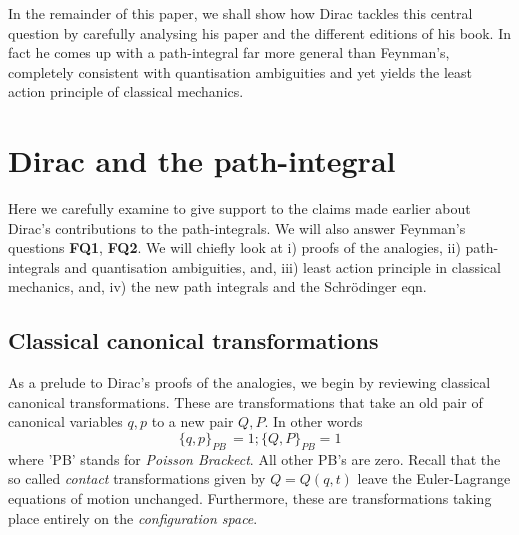 \documentclass[12pt]{article}
\newcommand{\be}{\begin{equation}}
\newcommand{\ee}{\end{equation}}
\begin{document}
In the remainder of this paper, we shall show how Dirac tackles this central question by carefully analysing his paper and the different editions of his book. In fact he comes up with a path-integral far more general than Feynman's, completely consistent with quantisation ambiguities and yet
yields the least action principle of classical mechanics. 


\section{Dirac and the path-integral}
Here we carefully examine \cite{diracpaper, diracbook2, diracbook4r} to give support to the claims made earlier about Dirac's contributions
to the path-integrals. We will also answer Feynman's questions {\bf FQ1}, {\bf FQ2}. We will chiefly look at i) proofs of the analogies, ii) 
path-integrals and quantisation ambiguities, and, iii) least action principle in classical mechanics, and, iv) the new path integrals and the
Schr\"odinger eqn. 
\subsection{Classical canonical transformations}
As a prelude to Dirac's proofs of
the analogies, we begin by reviewing classical canonical transformations.  
These are transformations that take an old pair of canonical variables $q,p$ to a new pair $Q,P$. In other words
\be
\label{eq:canonicaltr}
\{q,p\}_{PB}\,= 1; \{Q,P\}_{PB} = 1
\ee
where 'PB' stands for {\it Poisson Brackect}. All other PB's are zero. Recall that the so called {\it contact} transformations given by
$Q = Q(q,t)$ leave the Euler-Lagrange equations of motion unchanged. Furthermore, these are transformations taking place entirely on
the {\it configuration space}. 
\end{document}
